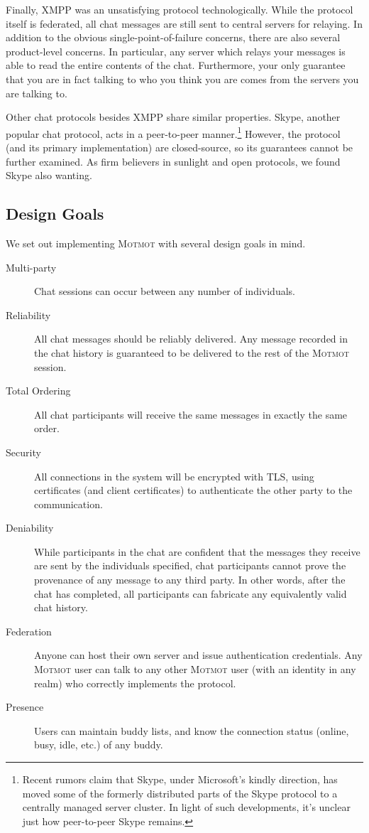 \documentclass{sig-alternate}
\newcommand\Motmot{\textsc{Motmot}\xspace}
\begin{document}
Finally, XMPP was an unsatisfying protocol technologically. While the protocol
itself is federated, all chat messages are still sent to central servers for
relaying. In addition to the obvious single-point-of-failure concerns, there are
also several product-level concerns. In particular, any server which relays your
messages is able to read the entire contents of the chat. Furthermore, your only
guarantee that you are in fact talking to who you think you are comes from the
servers you are talking to.

Other chat protocols besides XMPP share similar properties. Skype, another
popular chat protocol, acts in a peer-to-peer manner.\footnote{Recent rumors
claim that Skype, under Microsoft's kindly direction, has moved some of the
formerly distributed parts of the Skype protocol to a centrally managed server
cluster. In light of such developments, it's unclear just how peer-to-peer
Skype remains.} However, the protocol (and its primary implementation) are
closed-source, so its guarantees cannot be further examined. As firm believers
in sunlight and open protocols, we found Skype also wanting.

\subsection{Design Goals}

We set out implementing \Motmot with several design goals in mind.

\begin{description}
    \item[Multi-party] Chat sessions can occur between any number of
    individuals.
    \item[Reliability] All chat messages should be reliably delivered. Any message
    recorded in the chat history is guaranteed to be delivered to the rest of the
    \Motmot session.
    \item[Total Ordering] All chat participants will receive the same messages
    in exactly the same order.
    \item[Security] All connections in the system will be encrypted with TLS,
    using certificates (and client certificates) to authenticate the other party
    to the communication.
    \item[Deniability] While participants in the chat are confident that the
    messages they receive are sent by the individuals specified, chat
    participants cannot prove the provenance of any message to any third party.
    In other words, after the chat has completed, all participants can fabricate
    any equivalently valid chat history.
    \item[Federation] Anyone can host their own server and issue authentication
    credentials. Any \Motmot user can talk to any other \Motmot user (with an
    identity in any realm) who correctly implements the protocol.
    \item[Presence] Users can maintain buddy lists, and know the connection
    status (online, busy, idle, etc.) of any buddy.
\end{description}
\end{document}

